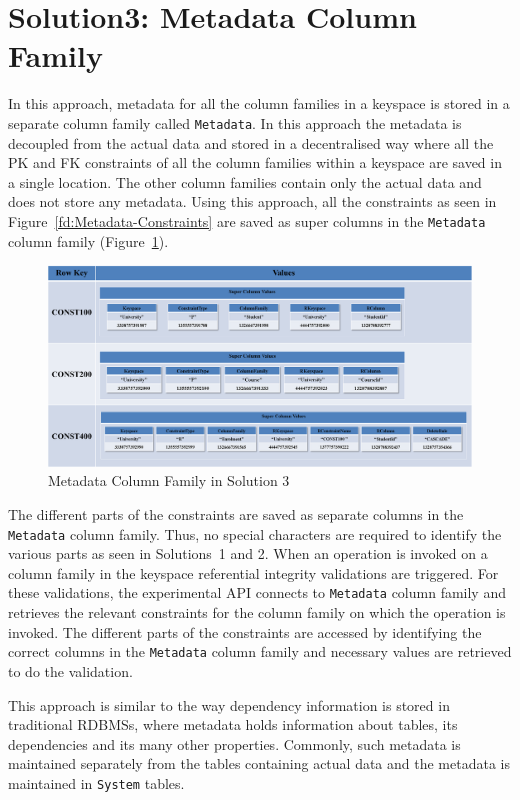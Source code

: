 \section{Solution3:  Metadata Column Family} \label{s:design-sol3}

In this approach,     metadata for all the column families in a keyspace is
stored in a separate column family called \texttt{Metadata}.   In this approach the metadata is
decoupled from the actual data and stored in a decentralised way where all the
\ac{PK} and \ac{FK} constraints of all the column families within a keyspace are
saved in a single location.  The other column families contain only the actual
data and does not store any metadata.  Using this approach,  all the constraints
as seen in Figure~\ref{fd:Metadata-Constraints} are saved as super columns in
the \texttt{Metadata} column family (Figure~\ref{fd:Metadata-Solution3}). 
 
	\begin{figure}[h] 
		\centering
		\includegraphics[width=.8\textwidth]{./figure/Solutions/Sol3-MD-ColumnFamily.png}
		\caption{Metadata Column Family in Solution 3}\label{fd:Metadata-Solution3}
	\end{figure}

The different parts of the constraints are saved as separate columns in the
\texttt{Metadata} column family. Thus,  no special characters are required to
identify the various parts as seen in Solutions~1 and 2.  When an operation is
invoked on a column family in the keyspace referential integrity validations
are triggered.  For these validations,  the experimental \ac{API} connects to
\texttt{Metadata} column family and retrieves the relevant constraints for the column family on
which the operation is invoked. 
The different parts of the constraints are accessed by identifying the
correct columns in the \texttt{Metadata} column family and necessary values are
retrieved to do the validation. 

This approach is similar to the way dependency information is
stored in traditional \acp{RDBMS},  where metadata holds information
about tables,  its dependencies and its many other properties.  Commonly,  such
metadata is maintained separately from the tables containing actual data and the
metadata is maintained in \texttt{System} tables.  

